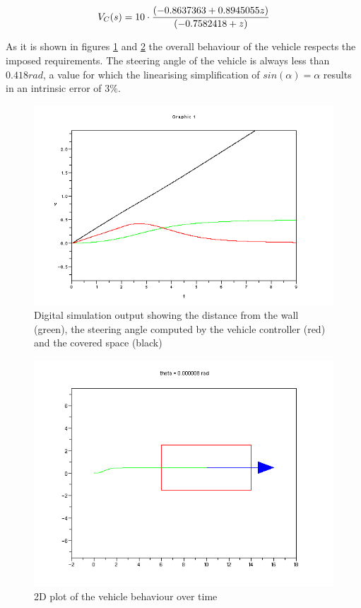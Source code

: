 \[
		V_C(s) =10\cdot{} {{(-0.8637363 + 0.8945055z)} \over {(-0.7582418+z)}}
\]

As it is shown in figures \ref{fig:VeDiSim} and \ref{fig:VePlSim} the overall behaviour of the vehicle respects the imposed requirements. The steering angle of the vehicle is always less than $0.418 rad$, a value for which the linearising simplification of $sin(\alpha)=\alpha$ results in an intrinsic error of $3\%$.

\begin{figure}[H]
  \begin{center}
  \includegraphics[scale=0.51]{FIGURES_3/VehicleDigitalSim.png}
    \caption[]{Digital simulation output showing the distance from the wall (green), the steering angle computed by the vehicle controller (red) and the covered space (black)}
    \label{fig:VeDiSim}
  \end{center}
\end{figure}

\begin{figure}[H]
  \begin{center}
  \includegraphics[scale=0.51]{FIGURES_3/VehiclePlotSim.png}
    \caption[]{2D plot of the vehicle behaviour over time}
    \label{fig:VePlSim}
  \end{center}
\end{figure}



